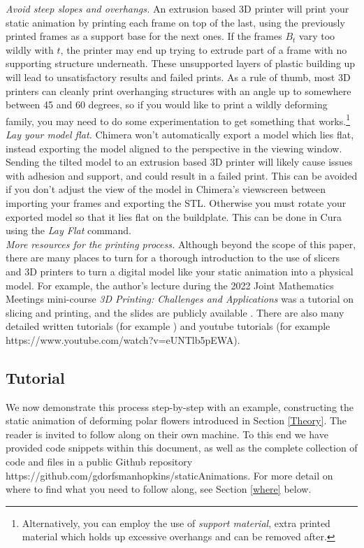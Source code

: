 \documentclass[12 pt]{article}
\begin{document}
\textit{Avoid steep slopes and overhangs.}  An extrusion based 3D printer will print your static animation by printing each frame on top of the last, using the previously printed frames as a support base for the next ones.  If the frames $B_t$ vary too wildly with $t$, the printer may end up trying to extrude part of a frame with no supporting structure underneath.  These unsupported layers of plastic building up will lead to unsatisfactory results and failed prints.  As a rule of thumb, most 3D printers can cleanly print overhanging structures with an angle up to somewhere between 45 and 60 degrees, so if you would like to print a wildly deforming family, you may need to do some experimentation to get something that works.\footnote{Alternatively, you can employ the use of \textit{support material}, extra printed material which holds up excessive overhangs and can be removed after.}\\

\textit{Lay your model flat.}  Chimera won't automatically export a model which lies flat, instead exporting the model aligned to the perspective in the viewing window.  Sending the tilted model to an extrusion based 3D printer will likely cause issues with adhesion and support, and could result in a failed print.  This can be avoided if you don't adjust the view of the model in Chimera's viewscreen between importing your frames and exporting the STL.  Otherwise you must rotate your exported model so that it lies flat on the buildplate.  This can be done in Cura using the \textit{Lay Flat} command.\\

\textit{More resources for the printing process.}  Although beyond the scope of this paper, there are many places to turn for a thorough introduction to the use of slicers and 3D printers to turn a digital model like your static animation into a physical model.  For example, the author's lecture during the 2022 Joint Mathematics Meetings mini-course \textit{3D Printing: Challenges and Applications} was a tutorial on slicing and printing, and the slides are publicly available \cite{mySlides}.  There are also many detailed written tutorials (for example \cite{printerlyTutorial}) and youtube tutorials (for example https://www.youtube.com/watch?v=eUNTlb5pEWA).

\subsection{Tutorial}\label{tutorial}
We now demonstrate this process step-by-step with an example, constructing the static animation of deforming polar flowers introduced in Section \ref{Theory}.  The reader is invited to follow along on their own machine.  To this end we have provided code snippets within this document, as well as the complete collection of code and files in a public Github repository https://github.com/gdorfsmanhopkins/staticAnimations.  For more detail on where to find what you need to follow along, see Section \ref{where} below.\\
\end{document}
